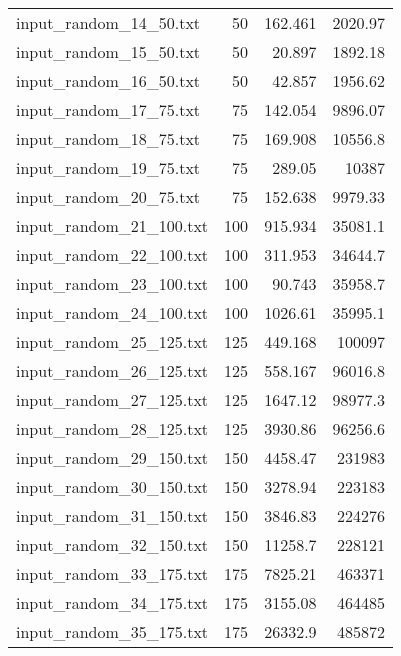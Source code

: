 \begin{table}[H]
\begin{tabular}{lrrr}
     input\_random\_14\_50.txt  &      50 &          162.461 &       2020.97  \\
     input\_random\_15\_50.txt  &      50 &           20.897 &       1892.18  \\
     input\_random\_16\_50.txt  &      50 &           42.857 &       1956.62  \\
     input\_random\_17\_75.txt  &      75 &          142.054 &       9896.07  \\
     input\_random\_18\_75.txt  &      75 &          169.908 &      10556.8   \\
     input\_random\_19\_75.txt  &      75 &          289.05  &      10387     \\
     input\_random\_20\_75.txt  &      75 &          152.638 &       9979.33  \\
     input\_random\_21\_100.txt &     100 &          915.934 &      35081.1   \\
     input\_random\_22\_100.txt &     100 &          311.953 &      34644.7   \\
     input\_random\_23\_100.txt &     100 &           90.743 &      35958.7   \\
     input\_random\_24\_100.txt &     100 &         1026.61  &      35995.1   \\
     input\_random\_25\_125.txt &     125 &          449.168 &     100097     \\
     input\_random\_26\_125.txt &     125 &          558.167 &      96016.8   \\
     input\_random\_27\_125.txt &     125 &         1647.12  &      98977.3   \\
     input\_random\_28\_125.txt &     125 &         3930.86  &      96256.6   \\
     input\_random\_29\_150.txt &     150 &         4458.47  &     231983     \\
     input\_random\_30\_150.txt &     150 &         3278.94  &     223183     \\
     input\_random\_31\_150.txt &     150 &         3846.83  &     224276     \\
     input\_random\_32\_150.txt &     150 &        11258.7   &     228121     \\
     input\_random\_33\_175.txt &     175 &         7825.21  &     463371     \\
     input\_random\_34\_175.txt &     175 &         3155.08  &     464485     \\
     input\_random\_35\_175.txt &     175 &        26332.9   &     485872     \\

\end{tabular}
\end{table}
